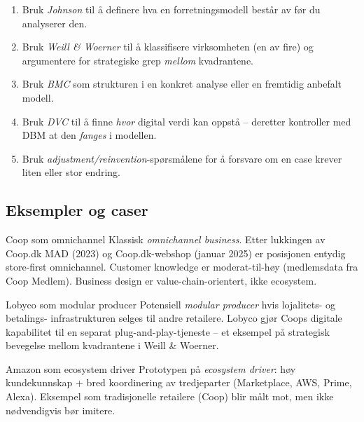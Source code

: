 \begin{enumerate}
  \item Bruk \emph{Johnson} til å definere hva en forretningsmodell består av
    før du analyserer den.
  \item Bruk \emph{Weill \& Woerner} til å klassifisere virksomheten (en av
    fire) og argumentere for strategiske grep \emph{mellom} kvadrantene.
  \item Bruk \emph{BMC} som strukturen i en konkret analyse eller en
    fremtidig anbefalt modell.
  \item Bruk \emph{DVC} til å finne \emph{hvor} digital verdi kan oppstå --
    deretter kontroller med DBM at den \emph{fanges} i modellen.
  \item Bruk \emph{adjustment/reinvention}-spørsmålene for å forsvare om en
    case krever liten eller stor endring.
\end{enumerate}

\subsection{Eksempler og caser}
\begin{eksempelboks}{Coop som omnichannel}
Klassisk \emph{omnichannel business}. Etter lukkingen av Coop.dk MAD (2023)
og Coop.dk-webshop (januar 2025) er posisjonen entydig store-first
omnichannel. Customer knowledge er moderat-til-høy (medlemsdata fra Coop
Medlem). Business design er value-chain-orientert, ikke ecosystem.
\end{eksempelboks}

\begin{eksempelboks}{Lobyco som modular producer}
Potensiell \emph{modular producer} hvis lojalitets- og betalings-
infrastrukturen selges til andre retailere. Lobyco gjør Coops digitale
kapabilitet til en separat plug-and-play-tjeneste -- et eksempel på
strategisk bevegelse mellom kvadrantene i Weill \& Woerner.
\end{eksempelboks}

\begin{eksempelboks}{Amazon som ecosystem driver}
Prototypen på \emph{ecosystem driver}: høy kundekunnskap + bred koordinering
av tredjeparter (Marketplace, AWS, Prime, Alexa). Eksempel som tradisjonelle
retailere (Coop) blir målt mot, men ikke nødvendigvis bør imitere.
\end{eksempelboks}

